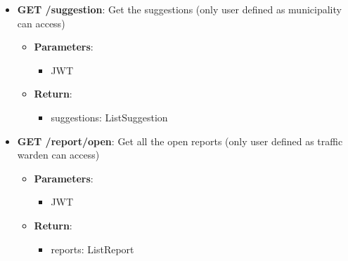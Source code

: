 \documentclass{article}
\begin{document}
\begin{itemize}
\begin{itemize}
				Get the ranking of the license plate that committed more violation
				\begin{itemize}
					\item \textbf{Parameters}:
						\begin{itemize}
							\item JWT
							\item filter: List\textlangle{}ReportType\textrangle{}
							\item from: Date \textit{analyze data only starting from this date}
							\item to: Date \textit{analyze data only until this date}
						\end{itemize}
					\item \textbf{Return}:
						\begin{itemize}
							\item ranking: List\textlangle{}String\textrangle{} \textit{ordered list of license plate}
						\end{itemize}
				\end{itemize}
			\item \textbf{GET /suggestion}:
				Get the suggestions (only user defined as municipality can access)
				\begin{itemize}
					\item \textbf{Parameters}:
						\begin{itemize}
							\item JWT
						\end{itemize}
					\item \textbf{Return}:
						\begin{itemize}
							\item suggestions: List\textlangle{}Suggestion\textrangle{}
						\end{itemize}
				\end{itemize}
			\item \textbf{GET /report/open}:
				Get all the open reports (only user defined as traffic warden can access)
				\begin{itemize}
					\item \textbf{Parameters}:
						\begin{itemize}
							\item JWT
						\end{itemize}
					\item \textbf{Return}:
						\begin{itemize}
							\item reports: List\textlangle{}Report\textrangle{}
						\end{itemize}

\end{itemize}
\end{itemize}
\end{itemize}
\end{document}
